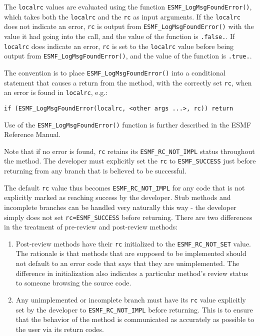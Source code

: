 The {\tt localrc} values are evaluated using the function {\tt ESMF\_LogMsgFoundError()}, which takes both the {\tt localrc} and the {\tt rc} as input arguments. If the {\tt localrc} does not indicate an error, {\tt rc} is output from {\tt ESMF\_LogMsgFoundError()} with the value it had going into the call, and the value of the function is {\tt .false.}. If {\tt localrc} does indicate an error, {\tt rc} is set to the {\tt localrc} value before being output from {\tt ESMF\_LogMsgFoundError()}, and the value of the function is {\tt .true.}.

The convention is to place {\tt ESMF\_LogMsgFoundError()} into a conditional statement that causes a return from the method, with the correctly set {\tt rc}, when an error is found in {\tt localrc}, e.g.:
\begin{verbatim}
if (ESMF_LogMsgFoundError(localrc, <other args ...>, rc)) return
\end{verbatim}
Use of the {\tt ESMF\_LogMsgFoundError()} function is further described in the ESMF Reference Manual.

Note that if no error is found, {\tt rc} retains its {\tt ESMF\_RC\_NOT\_IMPL} status throughout the method. The developer must explicitly set the {\tt rc} to {\tt ESMF\_SUCCESS} just before returning from any branch that is believed to be successful.

The default {\tt rc} value thus becomes {\tt ESMF\_RC\_NOT\_IMPL} for any code that is not explicitly marked as reaching success by the developer. Stub methods and incomplete branches can be handled very naturally this way - the developer simply does not set {\tt rc=ESMF\_SUCCESS} before returning. There are two differences in the treatment of pre-review and post-review methods:
\begin{enumerate}
\item Post-review methods have their {\tt rc} initialized to the {\tt ESMF\_RC\_NOT\_SET} value. The rationale is that methods that are supposed to be implemented should not default to an error code that says that they are unimplemented. The difference in initialization also indicates a particular method's review status to someone browsing the source code.

\item Any unimplemented or incomplete branch must have its {\tt rc} value explicitly set by the developer to {\tt ESMF\_RC\_NOT\_IMPL} before returning. This is to ensure that the behavior of the method is communicated as accurately as possible to the user via its return codes.

\end{enumerate}

